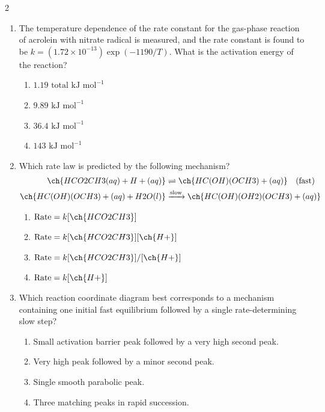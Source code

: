 \documentclass[10pt,letterpaper]{article}
\begin{document}
\begin{multicols*}{2}
\begin{enumerate}
    \item The temperature dependence of the rate constant for the gas-phase reaction of acrolein with nitrate radical is measured, and the rate constant is found to be $k = (1.72 \times 10^{-13})\exp(-1190/T)$. What is the activation energy of the reaction?
    \begin{enumerate}[label=(\textsubscript{\Alph*})]
        \item $1.19\text{ total kJ mol}^{-1}$
        \item $9.89\text{ kJ mol}^{-1}$
        \item $36.4\text{ kJ mol}^{-1}$
        \item $143\text{ kJ mol}^{-1}$
    \end{enumerate}

    \item Which rate law is predicted by the following mechanism?
    \begin{align*}
        \ch{HCO2CH3(aq) + H+(aq)} &\rightleftharpoons \ch{HC(OH)(OCH3)+(aq)} \quad (\text{fast}) \\
        \ch{HC(OH)(OCH3)+(aq) + H2O(l)} &\xrightarrow{\text{slow}} \ch{HC(OH)(OH2)(OCH3)+(aq)}
    \end{align*}
    \begin{enumerate}[label=(\textsubscript{\Alph*})]
        \item $\text{Rate} = k[\ch{HCO2CH3}]$
        \item $\text{Rate} = k[\ch{HCO2CH3}][\ch{H+}]$
        \item $\text{Rate} = k[\ch{HCO2CH3}]/[\ch{H+}]$
        \item $\text{Rate} = k[\ch{H+}]$
    \end{enumerate}

    \item Which reaction coordinate diagram best corresponds to a mechanism containing one initial fast equilibrium followed by a single rate-determining slow step?
    \begin{enumerate}[label=(\textsubscript{\Alph*})]
        \item Small activation barrier peak followed by a very high second peak.
        \item Very high peak followed by a minor second peak.
        \item Single smooth parabolic peak.
        \item Three matching peaks in rapid succession.
    \end{enumerate}


\end{enumerate}
\end{multicols*}
\end{document}
